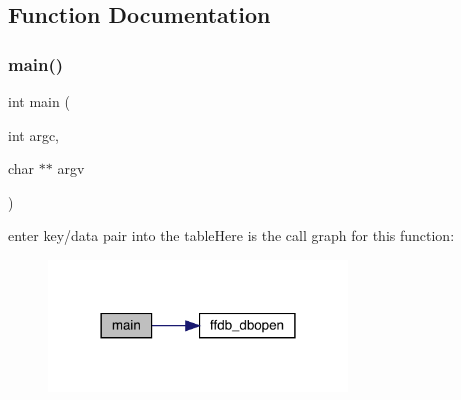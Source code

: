\subsection{Function Documentation}
\mbox{\label{adat-devel_2other__libs_2filedb_2filehash_2twrite_8c_a3c04138a5bfe5d72780bb7e82a18e627}} 
\subsubsection{\texorpdfstring{main()}{main()}}
{\footnotesize\ttfamily int main (\begin{DoxyParamCaption}\item[{int}]{argc,  }\item[{char $\ast$$\ast$}]{argv }\end{DoxyParamCaption})}

enter key/data pair into the tableHere is the call graph for this function\+:
\nopagebreak
\begin{figure}[H]
\begin{center}
\leavevmode
\includegraphics[width=225pt]{d9/d2e/adat-devel_2other__libs_2filedb_2filehash_2twrite_8c_a3c04138a5bfe5d72780bb7e82a18e627_cgraph}
\end{center}
\end{figure}
